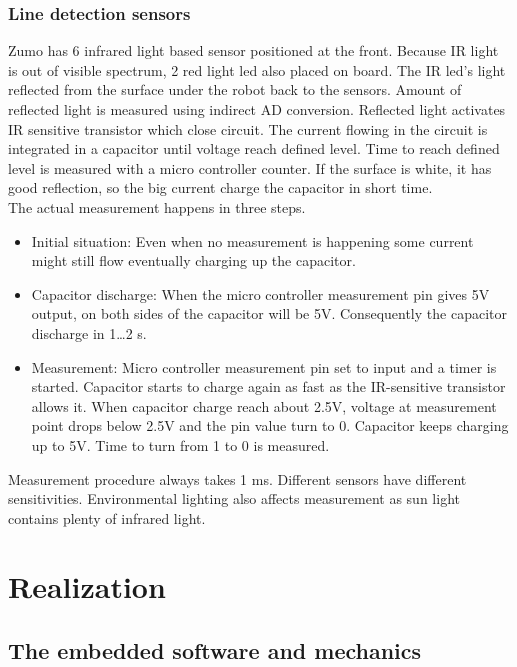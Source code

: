 \documentclass[11pt,a4paper,oneside,article]{memoir}
\begin{document}
\subsection{Line detection sensors}
Zumo has 6 infrared light based sensor positioned at the front. Because IR light is out of visible spectrum, 2 red light led also placed on board. The IR led's light reflected from the surface under the robot back to the sensors. Amount of reflected light is measured using indirect AD conversion. Reflected light activates IR sensitive transistor which close circuit. The current flowing in the circuit is integrated in a capacitor until voltage reach defined level. Time to reach defined level is measured with a micro controller counter. If the surface is white, it has good reflection, so the big current charge the capacitor in short time.\\
The actual measurement happens in three steps.
\begin{itemize}
	\item Initial situation: Even when no measurement is happening some current might still flow eventually charging up the capacitor.
	\item Capacitor discharge: When the micro controller measurement pin gives 5V output, on both sides of the capacitor will be 5V. Consequently the capacitor discharge in 1\ldots2 \textmu s.
	\item Measurement: Micro controller measurement pin set to input and a timer is started. Capacitor starts to charge again as fast as the IR-sensitive transistor allows it. When capacitor charge reach about 2.5V, voltage at measurement point drops below 2.5V and the pin value turn to 0. Capacitor keeps charging up to 5V. Time to turn from 1 to 0 is measured.
\end{itemize}
Measurement procedure always takes 1 ms. Different sensors have different sensitivities. Environmental lighting also affects measurement as sun light contains plenty of infrared light.\cite{Lectures}

\chapter{Realization}

\section{The embedded software and mechanics}
\end{document}
